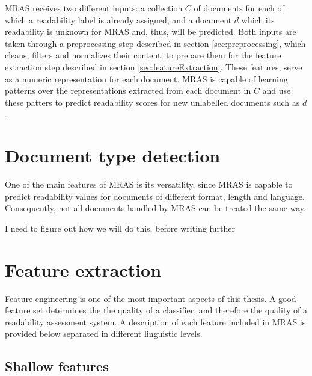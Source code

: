 \documentclass{bsu-ms}
\newcommand{\projectName}{MRAS\xspace}
\begin{document}
\projectName receives two different inputs: a collection $C$ of documents for each of which a readability label is already assigned, and a document $d$ which its readability is unknown for \projectName and, thus, will be predicted. Both inputs are taken through a preprocessing step described in section \ref{sec:preprocessing}, which cleans, filters and normalizes their content, to prepare them for the feature extraction step described in section \ref{sec:featureExtraction}. These features, serve as a numeric representation for each document. \projectName is capable of learning patterns over the representations extracted from each document in $C$ and use these patters to predict readability scores for new unlabelled documents such as $d$.








\section{Document type detection}
One of the main features of \projectName is its versatility, since \projectName is capable to predict readability values for documents of different format, length and language. Consequently, not all documents handled by \projectName can be treated the same way.



{\color{red} I need to figure out how we will do this, before writing further}








\section{Feature extraction}
\label{sec:features}
Feature engineering is one of the most important aspects of this thesis. A good feature set determines the the quality of a classifier, and therefore the quality of a readability assessment system. A description of each feature included in \projectName is provided below separated in different linguistic levels.


\subsection{Shallow features}
\end{document}
